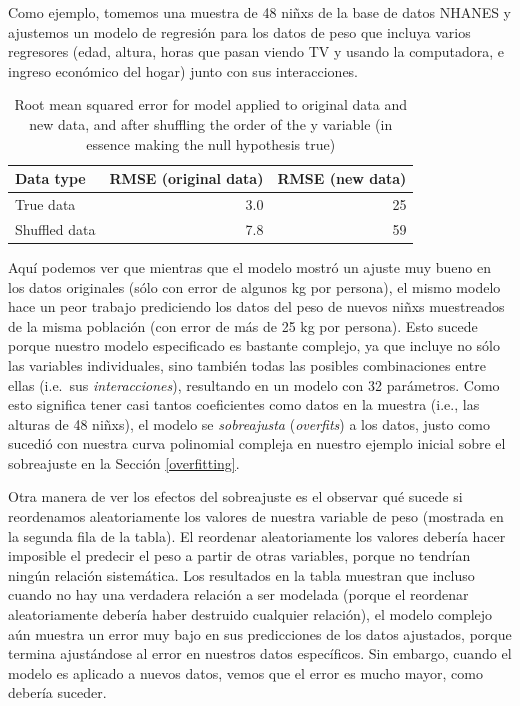 \documentclass[
  12pt,
]{book}
\begin{document}
Como ejemplo, tomemos una muestra de 48 niñxs de la base de datos NHANES y ajustemos un modelo de regresión para los datos de peso que incluya varios regresores (edad, altura, horas que pasan viendo TV y usando la computadora, e ingreso económico del hogar) junto con sus interacciones.

\begin{table}

\caption{\label{tab:unnamed-chunk-89}Root mean squared error for model applied to original data and new data, and after shuffling the order of the y variable (in essence making the null hypothesis true)}
\centering
\begin{tabular}[t]{l|r|r}
\hline
Data type & RMSE (original data) & RMSE (new data)\\
\hline
True data & 3.0 & 25\\
\hline
Shuffled data & 7.8 & 59\\
\hline
\end{tabular}
\end{table}

Aquí podemos ver que mientras que el modelo mostró un ajuste muy bueno en los datos originales (sólo con error de algunos kg por persona), el mismo modelo hace un peor trabajo prediciendo los datos del peso de nuevos niñxs muestreados de la misma población (con error de más de 25 kg por persona). Esto sucede porque nuestro modelo especificado es bastante complejo, ya que incluye no sólo las variables individuales, sino también todas las posibles combinaciones entre ellas (i.e.~sus \emph{interacciones}), resultando en un modelo con 32 parámetros. Como esto significa tener casi tantos coeficientes como datos en la muestra (i.e., las alturas de 48 niñxs), el modelo se \emph{sobreajusta} (\emph{overfits}) a los datos, justo como sucedió con nuestra curva polinomial compleja en nuestro ejemplo inicial sobre el sobreajuste en la Sección \ref{overfitting}.

Otra manera de ver los efectos del sobreajuste es el observar qué sucede si reordenamos aleatoriamente los valores de nuestra variable de peso (mostrada en la segunda fila de la tabla). El reordenar aleatoriamente los valores debería hacer imposible el predecir el peso a partir de otras variables, porque no tendrían ningún relación sistemática. Los resultados en la tabla muestran que incluso cuando no hay una verdadera relación a ser modelada (porque el reordenar aleatoriamente debería haber destruido cualquier relación), el modelo complejo aún muestra un error muy bajo en sus predicciones de los datos ajustados, porque termina ajustándose al error en nuestros datos específicos. Sin embargo, cuando el modelo es aplicado a nuevos datos, vemos que el error es mucho mayor, como debería suceder.
\end{document}
